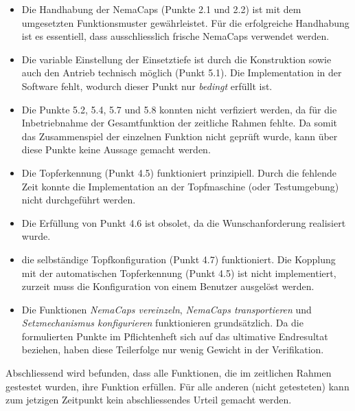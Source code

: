 \begin{itemize}

	\item Die Handhabung der NemaCaps (Punkte 2.1 und 2.2) ist mit dem umgesetzten Funktionsmuster gewährleistet. Für die erfolgreiche Handhabung ist es essentiell, dass ausschliesslich frische NemaCaps verwendet werden. 
	
	\item Die variable Einstellung der Einsetztiefe ist durch die Konstruktion sowie auch den Antrieb technisch möglich (Punkt 5.1). Die Implementation in der Software fehlt, wodurch dieser Punkt nur \textit{bedingt} erfüllt ist.
	
	\item Die Punkte 5.2, 5.4, 5.7 und 5.8 konnten nicht verfiziert werden, da für die Inbetriebnahme der Gesamtfunktion der zeitliche Rahmen fehlte. Da somit das Zusammenspiel der einzelnen Funktion nicht geprüft wurde, kann über diese Punkte keine Aussage gemacht werden.
	
	\item Die Topferkennung (Punkt 4.5) funktioniert prinzipiell. Durch die fehlende Zeit konnte die Implementation an der Topfmaschine (oder Testumgebung) nicht durchgeführt werden.
	
	\item Die Erfüllung von Punkt 4.6 ist obsolet, da die Wunschanforderung realisiert wurde.
	
	\item die selbständige Topfkonfiguration (Punkt 4.7) funktioniert. Die Kopplung mit der automatischen Topferkennung (Punkt 4.5) ist nicht implementiert, zurzeit muss die Konfiguration von einem Benutzer ausgelöst werden.
	
	\item Die Funktionen \textit{NemaCaps vereinzeln}, \textit{NemaCaps transportieren} und \textit{Setzmechanismus konfigurieren} funktionieren grundsätzlich. Da die formulierten Punkte im Pflichtenheft sich auf das ultimative Endresultat beziehen, haben diese Teilerfolge nur wenig Gewicht in der Verifikation.
\end{itemize}

Abschliessend wird befunden, dass alle Funktionen, die im zeitlichen Rahmen gestestet wurden, ihre Funktion erfüllen. Für alle anderen (nicht getesteten) kann zum jetzigen Zeitpunkt kein abschliessendes Urteil gemacht werden.